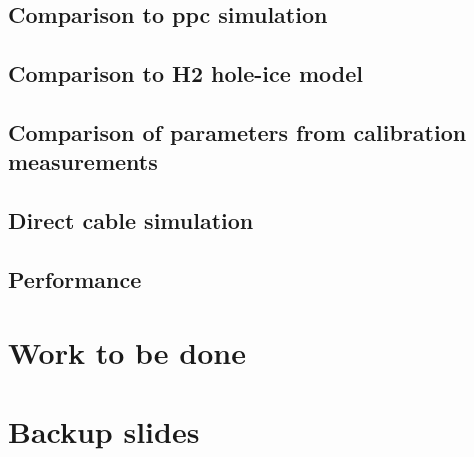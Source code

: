 \documentclass[green, 12pt]{beamer}
\begin{document}
  \subsection{Comparison to ppc simulation}
    
  \subsection{Comparison to H2 hole-ice model}
    
  \subsection{Comparison of parameters from calibration measurements}
    
  \subsection{Direct cable simulation}
    
  \subsection{Performance}
    

  \section{Work to be done}
    
    



\appendix
\section{Backup slides}














\end{document}
